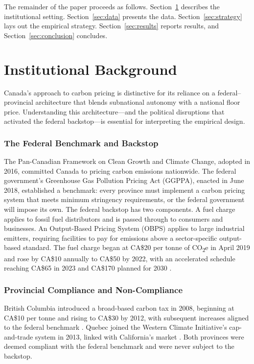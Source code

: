 \documentclass[12pt]{article}
\begin{document}
The remainder of the paper proceeds as follows. Section~\ref{sec:background} describes the institutional setting. Section~\ref{sec:data} presents the data. Section~\ref{sec:strategy} lays out the empirical strategy. Section~\ref{sec:results} reports results, and Section~\ref{sec:conclusion} concludes.


\section{Institutional Background}
\label{sec:background}

Canada's approach to carbon pricing is distinctive for its reliance on a federal--provincial architecture that blends subnational autonomy with a national floor price. Understanding this architecture---and the political disruptions that activated the federal backstop---is essential for interpreting the empirical design.

\subsubsection*{The Federal Benchmark and Backstop} The Pan-Canadian Framework on Clean Growth and Climate Change, adopted in 2016, committed Canada to pricing carbon emissions nationwide. The federal government's Greenhouse Gas Pollution Pricing Act (GGPPA), enacted in June 2018, established a benchmark: every province must implement a carbon pricing system that meets minimum stringency requirements, or the federal government will impose its own. The federal backstop has two components. A fuel charge applies to fossil fuel distributors and is passed through to consumers and businesses. An Output-Based Pricing System (OBPS) applies to large industrial emitters, requiring facilities to pay for emissions above a sector-specific output-based standard. The fuel charge began at CA\$20 per tonne of CO\textsubscript{2}e in April 2019 and rose by CA\$10 annually to CA\$50 by 2022, with an accelerated schedule reaching CA\$65 in 2023 and CA\$170 planned for 2030 \citep{ECCC2023}.

\subsubsection*{Provincial Compliance and Non-Compliance} British Columbia introduced a broad-based carbon tax in 2008, beginning at CA\$10 per tonne and rising to CA\$30 by 2012, with subsequent increases aligned to the federal benchmark \citep{Murray2015, Yamazaki2017}. Quebec joined the Western Climate Initiative's cap-and-trade system in 2013, linked with California's market \citep{Schmalensee2017}. Both provinces were deemed compliant with the federal benchmark and were never subject to the backstop.
\end{document}
